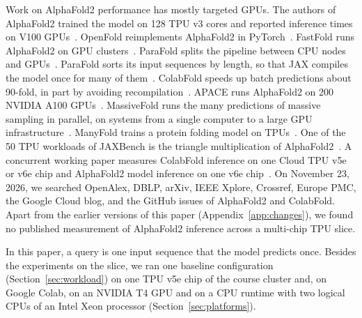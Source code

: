 Work on AlphaFold2 performance has mostly targeted GPUs.
The authors of AlphaFold2 trained the model on 128 TPU v3 cores and reported inference times on V100 GPUs~\cite{jumper2021alphafold}. %
OpenFold reimplements AlphaFold2 in PyTorch~\cite{ahdritz2024openfold}. FastFold runs AlphaFold2 on GPU
clusters~\cite{cheng2024fastfold}. ParaFold splits the pipeline between CPU nodes and GPUs~\cite{zhong2022parafold}.
ParaFold sorts its input sequences by length, so that JAX compiles the model once for many of
them~\cite{zhong2022parafold}.
ColabFold speeds up batch predictions about 90-fold, in part by avoiding recompilation~\cite{colabfold2022}. %
APACE runs AlphaFold2 on 200 NVIDIA A100 GPUs~\cite{apace2024}. %
MassiveFold runs the many predictions of massive sampling in parallel, on systems from a single computer to a large GPU infrastructure~\cite{raouraoua2024massivefold}. %
ManyFold trains a protein folding model on TPUs~\cite{villegasmorcillo2023manyfold}.
One of the 50 TPU workloads of JAXBench is the triangle multiplication of AlphaFold2~\cite{jaxbench2026}. %
A concurrent working paper measures ColabFold inference on one Cloud TPU v5e or v6e chip and AlphaFold2 model
inference on one v6e chip~\cite{forsyth2026timetoscience}.
On November 23, 2026, we searched OpenAlex, DBLP, arXiv, IEEE Xplore, Crossref, Europe PMC, the Google Cloud blog, and the GitHub issues of AlphaFold2 and ColabFold. %
Apart from the earlier versions of this paper\ifappendix{} (Appendix~\ref{app:changes})\fi, we found no published
measurement of AlphaFold2 inference across a multi-chip TPU slice.

In this paper, a query is one input sequence that the model predicts once. Besides the experiments on the slice, we ran
one baseline configuration (Section~\ref{sec:workload}) on one TPU v5e chip of the course cluster and, on Google Colab, on an NVIDIA T4 GPU and on a CPU runtime with two logical CPUs of an Intel Xeon processor (Section~\ref{sec:platforms}). %

